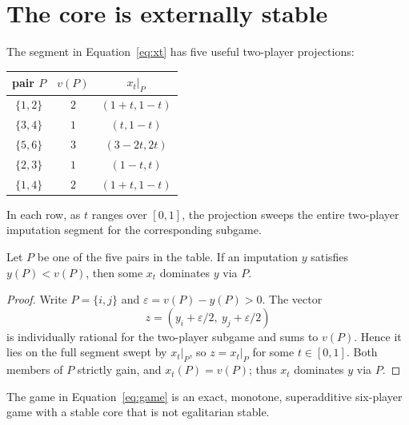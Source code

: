 \section{The core is externally stable}\label{sec:stability}

The segment in Equation~\eqref{eq:xt} has five useful two-player
projections:
\begin{center}
\begin{tabular}{@{}c c c@{}}
\toprule
pair $P$ & $v(P)$ & $x_t|_P$\\
\midrule
$\{1,2\}$ & $2$ & $(1+t,1-t)$\\
$\{3,4\}$ & $1$ & $(t,1-t)$\\
$\{5,6\}$ & $3$ & $(3-2t,2t)$\\
$\{2,3\}$ & $1$ & $(1-t,t)$\\
$\{1,4\}$ & $2$ & $(1+t,1-t)$\\
\bottomrule
\end{tabular}
\end{center}
In each row, as $t$ ranges over $[0,1]$, the projection sweeps the entire
two-player imputation segment for the corresponding subgame.

\begin{lemma}\label{lem:pair}
Let $P$ be one of the five pairs in the table. If an imputation $y$ satisfies
$y(P)<v(P)$, then some $x_t$ dominates $y$ via $P$.
\end{lemma}

\begin{proof}
Write $P=\{i,j\}$ and
$\varepsilon=v(P)-y(P)>0$. The vector
\[
 z=(y_i+\varepsilon/2,\ y_j+\varepsilon/2)
\]
is individually rational for the two-player subgame and sums to $v(P)$.
Hence it lies on the full segment swept by $x_t|_P$, so
$z=x_t|_P$ for some $t\in[0,1]$. Both members of $P$ strictly gain, and
$x_t(P)=v(P)$; thus $x_t$ dominates $y$ via $P$.
\end{proof}

\begin{theorem}\label{thm:main}
The game in Equation~\eqref{eq:game} is an exact, monotone, superadditive
six-player game with a stable core that is not egalitarian stable.
\end{theorem}

